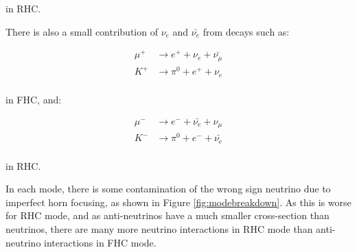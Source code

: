 in RHC. 

There is also a small contribution of $\nu_e$ and $\bar{\nu_e}$ from decays such as:

\begin{equation}
\begin{aligned}
\mu^{+} &\rightarrow e^+ + \nu_e + \bar{\nu_{\mu}}\\
K^{+} &\rightarrow \pi^0 + e^{+} + \nu_e\\
 \end{aligned}
\end{equation}

in FHC, and:

\begin{equation}
\begin{aligned}
\mu^{-} &\rightarrow e^- + \bar{\nu_e} + \nu_{\mu}\\
K^{-} &\rightarrow \pi^0 + e^{-} + \bar{\nu_e}\\
 \end{aligned}
\end{equation}

in RHC.

In each mode, there is some contamination of the wrong sign neutrino due to imperfect horn focusing, as shown in Figure \ref{fig:modebreakdown}. As this is worse for RHC mode, and as anti-neutrinos have a much smaller cross-section than neutrinos, there are many more neutrino interactions in RHC mode than anti-neutrino interactions in FHC mode.

